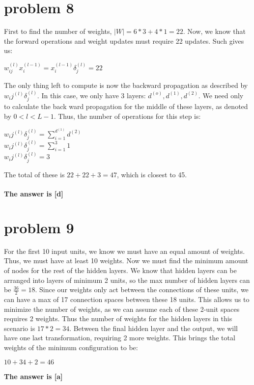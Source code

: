 \documentclass{article}
\begin{document}
\section*{problem 8} 
First to find the number of weights, $|W| = 6*3 + 4*1 = 22$. Now, we know that the forward operations and weight updates must require 22 updates. Such gives us:
\begin{center}
    $w^{(l)}_{ij}x_i^{(l-1)} = x_i^{(l-1)}\delta_j^{(l)} = 22$
\end{center}
The only thing left to compute is now the backward propagation as described by $w_ij^{(l)}\delta_j^{(l)}$. In this case, we only have 3 layers: $d^{(o)}, d^{(1)}, d^{(2)}$. We need only to calculate the back ward propagation for the middle of these layers, as denoted by $0<l<L-1$. Thus, the number of operations for this step is:
\begin{center}
    $w_ij^{(l)}\delta_j^{(l)} = \sum^{d^{(1)}}_{i=1}d^{(2)}$\\
    $w_ij^{(l)}\delta_j^{(l)} = \sum^3_{i=1}1$\\
    $w_ij^{(l)}\delta_j^{(l)} = 3$
\end{center}
The total of these is $22+22+3 = 47$, which is closest to 45.\\\\
\textbf{The answer is [d]}

\section*{problem 9}
For the first 10 input units, we know we must have an equal amount of weights. Thus, we must have at least 10 weights. Now we must find the minimum amount of nodes for the rest of the hidden layers. We know that hidden layers can be arranged into layers of minimum 2 units, so the max number of hidden layers can be $\frac{36}{2} = 18$. Since our weights only act between the connections of these units, we can have a max of 17 connection spaces between these 18 units. This allows us to minimize the number of weights, as we can assume each of these 2-unit spaces requires 2 weights. Thus the number of weights for the hidden layers in this scenario is $17*2 = 34$. Between the final hidden layer and the output, we will have one last transformation, requiring 2 more weights. This brings the total weights of the minimum configuration to be:
\begin{center}
    $10 + 34 + 2 = 46$
\end{center}
\textbf{The answer is [a]}
\end{document}
